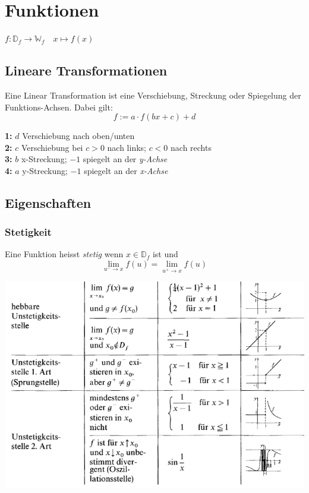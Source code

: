 
\section{Funktionen}
$ f:  \mathbb{D}_f \to \mathbb{W}_f \quad x \mapsto f(x) $

\subsection{Lineare Transformationen}
Eine Linear Transformation ist eine Verschiebung, Streckung oder Spiegelung der Funktions-Achsen. Dabei gilt:
\[ f := a \cdot f(bx + c) + d \]

\noindent \textbf{1:} $d$ Verschiebung nach oben/unten \\
\textbf{2:} $c$ Verschiebung bei $c>0$ nach links; $c<0$ nach rechts \\
\textbf{3:} $b$ x-Streckung; $-1$ spiegelt an der\textit{ y-Achse} \\
\textbf{4:} $a$ y-Streckung; $-1$ spiegelt an der \textit{x-Achse }\\

\subsection{Eigenschaften}
\subsubsection{Stetigkeit}
Eine Funktion heisst \textit{stetig} wenn $x \in \mathbb{D}_f$ ist und \[\lim\limits_{u^- \rightarrow x}f(u) = \lim\limits_{u^+ \rightarrow x}f(u)\]

\noindent\includegraphics[width=\columnwidth]{./Images/unstetigkeit.png}

